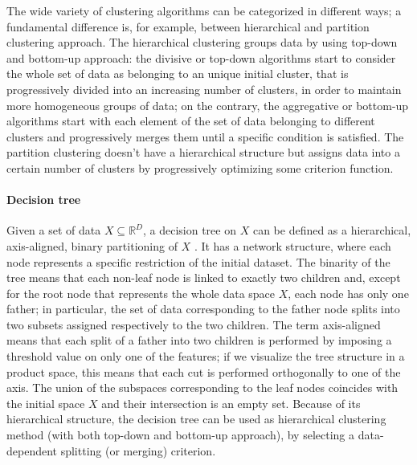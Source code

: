 \documentclass[a4paper]{article}
\begin{document}
The wide variety of clustering algorithms can be categorized in different ways;
a fundamental difference is, for example, between hierarchical and partition clustering approach.
The hierarchical clustering groups data by using top-down and bottom-up approach:
the divisive or top-down algorithms start to consider the whole set of data as belonging to an unique initial cluster, that is progressively divided into an increasing number of clusters, in order to maintain more homogeneous groups of data;
on the contrary, the aggregative or bottom-up algorithms start with each element of the set of data belonging to different clusters and progressively merges them until a specific condition is satisfied.  
The partition clustering doesn't have a hierarchical structure but assigns data into a certain number of clusters by progressively optimizing some criterion function.


\paragraph{Decision tree}

Given a set of data $X \subseteq \mathbb{R}^D$, a decision tree on $X$ can be defined as a hierarchical, axis-aligned, binary partitioning of $X$ \cite{2015MPMachineLearning}.
It has a network structure, where each node represents a specific restriction of the initial dataset.
The binarity of the tree means that each non-leaf node is linked to exactly two children and, except for the root node that represents the whole data space $X$, each node has only one father;
in particular, the set of data corresponding to the father node splits into two subsets assigned respectively to the two children.
The term axis-aligned means that each split of a father into two children is performed by imposing a threshold value on only one of the features;
if we visualize the tree structure in a product space, this means that each cut is performed orthogonally to one of the axis.
The union of the subspaces corresponding to the leaf nodes coincides with the initial space $X$ and their intersection is an empty set.
Because of its hierarchical structure, the decision tree can be used as hierarchical clustering method (with both top-down and bottom-up approach), by selecting a data-dependent splitting (or merging) criterion.
\end{document}
